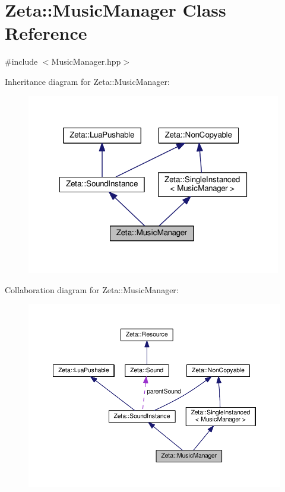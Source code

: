 \hypertarget{classZeta_1_1MusicManager}{\section{Zeta\+:\+:Music\+Manager Class Reference}
\label{classZeta_1_1MusicManager}
}


{\ttfamily \#include $<$Music\+Manager.\+hpp$>$}



Inheritance diagram for Zeta\+:\+:Music\+Manager\+:\nopagebreak
\begin{figure}[H]
\begin{center}
\leavevmode
\includegraphics[width=315pt]{classZeta_1_1MusicManager__inherit__graph}
\end{center}
\end{figure}


Collaboration diagram for Zeta\+:\+:Music\+Manager\+:\nopagebreak
\begin{figure}[H]
\begin{center}
\leavevmode
\includegraphics[width=350pt]{classZeta_1_1MusicManager__coll__graph}
\end{center}
\end{figure}
